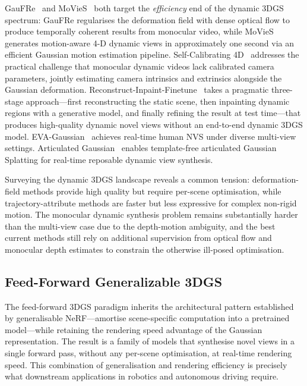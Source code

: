 GauFRe~\citep{liang2024gaufre} and MoVieS~\citep{sun2024movies} both target
the \emph{efficiency} end of the dynamic 3DGS spectrum:
GauFRe regularises the deformation field with dense optical flow to produce
temporally coherent results from monocular video, while MoVieS generates
motion-aware 4-D dynamic views in approximately one second via an
efficient Gaussian motion estimation pipeline.
Self-Calibrating 4D~\citep{kim2024selfcal4d} addresses the practical challenge
that monocular dynamic videos lack calibrated camera parameters, jointly
estimating camera intrinsics and extrinsics alongside the Gaussian deformation.
Reconstruct-Inpaint-Finetune~\citep{han2024rif} takes a pragmatic three-stage
approach---first reconstructing the static scene, then inpainting dynamic regions
with a generative model, and finally refining the result at test time---that
produces high-quality dynamic novel views without an end-to-end dynamic 3DGS model.
EVA-Gaussian~\citep{hu2024evacg} achieves real-time human NVS under diverse
multi-view settings.
Articulated Gaussian~\citep{li2024articulatedgs} enables template-free
articulated Gaussian Splatting for real-time reposable dynamic view synthesis.

Surveying the dynamic 3DGS landscape reveals a common tension: deformation-field
methods provide high quality but require per-scene optimisation, while
trajectory-attribute methods are faster but less expressive for complex
non-rigid motion.
The monocular dynamic synthesis problem remains substantially harder than
the multi-view case due to the depth-motion ambiguity, and the best current
methods still rely on additional supervision from optical flow and monocular
depth estimates to constrain the otherwise ill-posed optimisation.

\subsection{Feed-Forward Generalizable 3DGS}

The feed-forward 3DGS paradigm inherits the architectural pattern established
by generalisable NeRF---amortise scene-specific computation into a pretrained
model---while retaining the rendering speed advantage of the Gaussian representation.
The result is a family of models that synthesise novel views in a single
forward pass, without any per-scene optimisation, at real-time rendering speed.
This combination of generalisation and rendering efficiency is precisely what
downstream applications in robotics and autonomous driving require.

